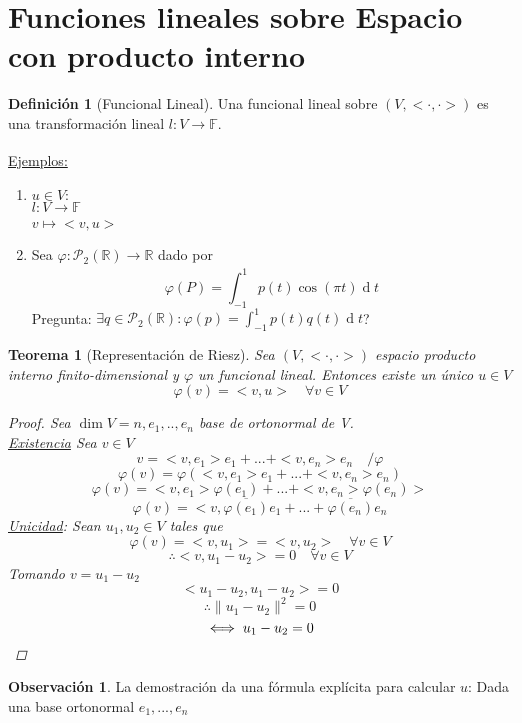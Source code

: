 \documentclass[11pt]{book}
\renewcommand{\d}[1]{\ensuremath{\operatorname{d}\!{#1}}}
\newcommand{\set}[1]{\mathbb{#1}}
\newcommand{\func}[5]{#1:#2\xrightarrow[#5]{#4}#3}
\newtheorem{thm}{Teorema}[section]
\theoremstyle{definition}
\newtheorem{defn}{Definición}[section]
\newtheorem{obs}{Observación}[section]
\begin{document}
\section{Funciones lineales sobre Espacio con producto interno}
\begin{defn}[Funcional Lineal]
	Una funcional lineal sobre $(V,<\cdot,\cdot>)$ es una transformación lineal $\func{l}{V}{\set{F}}{}{}$.
\end{defn}
\underline{Ejemplos:}
\begin{enumerate}
	\item $u\in V:$\\
	      $\func{l}{V}{\set{F}}{}{}$\\
	      $v\mapsto <v,u>$

	\item Sea $\func{\varphi}{\mathcal{P}_2(\set{R})}{\set{R}}{}{}$ dado por
	      \[\varphi(P)=\int^1_{-1}p(t)\cos(\pi t)\d{t}\]
	      Pregunta: $\exists q\in\mathcal{P}_2(\set{R}):\varphi(p)=\int^1_{-1}p(t)q(t)\d{t}$?
\end{enumerate}
\begin{thm}[Representación de Riesz]
	Sea $(V,<\cdot,\cdot>)$ espacio producto interno finito-dimensional y $\varphi$ un funcional lineal. Entonces existe un único $u\in V$
	\[\varphi(v)=<v,u>\quad\forall v\in V\]
	\begin{proof}
		Sea $\dim V=n, e_1,..,e_n$ base de ortonormal de V.\\
		\underline{Existencia} Sea $v\in V$
		\[v=<v,e_1>e_1+...+<v,e_n>e_n\quad/\varphi\]
		\[\varphi(v)=\varphi(<v,e_1>e_1+...+<v,e_n>e_n)\]
		\[\varphi(v)=<v,e_1>\varphi(e_1)+...+<v,e_n>\varphi(e_n)>\]
		\[\varphi(v)=<v,\overline{\varphi(e_1)}e_1+...+\overline{\varphi(e_n)}e_n\]
		\underline{Unicidad}: Sean $u_1,u_2\in V$ tales que
		\[\varphi(v)=<v,u_1>=<v,u_2>\quad\forall v\in V\]
		\[\therefore <v,u_1-u_2>=0\quad\forall v\in V\]
		Tomando $v=u_1-u_2$
		\[<u_1-u_2,u_1-u_2>=0\]
		\[\therefore\|u_1-u_2\|^2=0\]
		\[\iff u_1-u_2=0\qedhere\]
	\end{proof}
\end{thm}
\begin{obs}
	La demostración da una fórmula explícita para calcular $u$: Dada una base ortonormal $e_1,...,e_n$
\end{obs}
\end{document}
